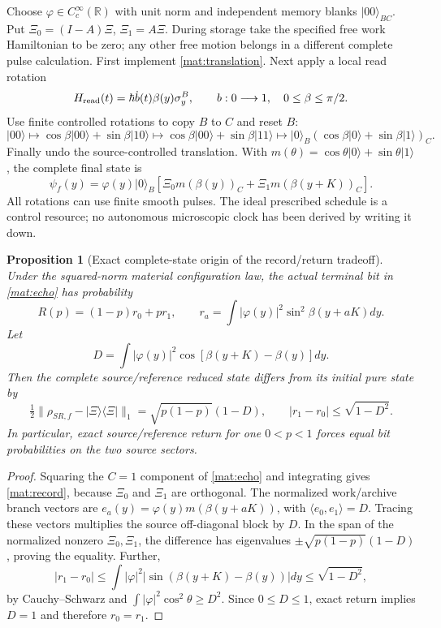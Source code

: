 \documentclass[11pt,oneside,openany]{book}
\newtheorem{proposition}[theorem]{Proposition}
\theoremstyle{definition}
\theoremstyle{remark}\newtheorem{remark}[theorem]{Remark}
\begin{document}
Choose $\varphi\in C_c^\infty(\mathbb R)$ with unit norm and independent memory blanks $|00\rangle_{BC}$. Put $\Xi_0=(I-A)\Xi$, $\Xi_1=A\Xi$. During storage take the specified free work Hamiltonian to be zero; any other free motion belongs in a different complete pulse calculation. First implement \eqref{mat:translation}. Next apply a local read rotation
\[
 H_{\rm read}(t)=\hbar\dot b(t)\beta(y)\sigma_y^B,
 \qquad b:0\longrightarrow1,\quad 0\le\beta\le\pi/2.
\]
Use finite controlled rotations to copy $B$ to $C$ and reset $B$:
\[
 |00\rangle\mapsto\cos\beta|00\rangle+\sin\beta|10\rangle
 \mapsto\cos\beta|00\rangle+\sin\beta|11\rangle
 \mapsto|0\rangle_B(\cos\beta|0\rangle+\sin\beta|1\rangle)_C.
\]
Finally undo the source-controlled translation. With
$m(\theta)=\cos\theta|0\rangle+\sin\theta|1\rangle$, the complete final state is
\begin{equation}
 \psi_f(y)=\varphi(y)|0\rangle_B
       [\Xi_0m(\beta(y))_C+\Xi_1m(\beta(y+K))_C].
 \label{mat:echo}
\end{equation}
All rotations can use finite smooth pulses. The ideal prescribed schedule is a control resource; no autonomous microscopic clock has been derived by writing it down.

\begin{proposition}[Exact complete-state origin of the record/return tradeoff]
\label{mat:echoresult}
Under the squared-norm material configuration law, the actual terminal bit in \eqref{mat:echo} has probability
\begin{equation}
 R(p)=(1-p)r_0+pr_1,\qquad
 r_a=\int|\varphi(y)|^2\sin^2\beta(y+aK)dy.
 \label{mat:record}
\end{equation}
Let
\[
 D=\int|\varphi(y)|^2\cos[\beta(y+K)-\beta(y)]dy.
\]
Then the complete source/reference reduced state differs from its initial pure state by
\begin{equation}
 \tfrac12\|\rho_{SR,f}-|\Xi\rangle\langle\Xi|\|_1
       =\sqrt{p(1-p)}(1-D),\qquad
 |r_1-r_0|\le\sqrt{1-D^2}.
 \label{mat:echobound}
\end{equation}
In particular, exact source/reference return for one $0<p<1$ forces equal bit probabilities on the two source sectors.
\end{proposition}
\begin{proof}
Squaring the $C=1$ component of \eqref{mat:echo} and integrating gives \eqref{mat:record}, because $\Xi_0$ and $\Xi_1$ are orthogonal. The normalized work/archive branch vectors are $e_a(y)=\varphi(y)m(\beta(y+aK))$, with $\langle e_0,e_1\rangle=D$. Tracing these vectors multiplies the source off-diagonal block by $D$. In the span of the normalized nonzero $\Xi_0,\Xi_1$, the difference has eigenvalues $\pm\sqrt{p(1-p)}(1-D)$, proving the equality. Further,
\[
 |r_1-r_0|\le\int|\varphi|^2|\sin(\beta(y+K)-\beta(y))|dy
 \le\sqrt{1-D^2},
\]
by Cauchy--Schwarz and $\int|\varphi|^2\cos^2\theta\ge D^2$. Since $0\le D\le1$, exact return implies $D=1$ and therefore $r_0=r_1$.
\end{proof}
\end{document}
